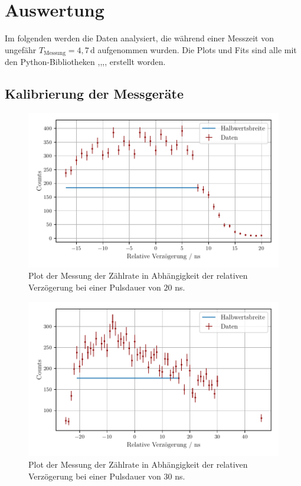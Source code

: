 \section{Auswertung}
\label{sec:Auswertung}

Im folgenden werden die Daten analysiert, die während einer Messzeit von ungefähr $T_\text{Messung} = 4{,}7  \, \unit\day$ aufgenommen wurden.
Die Plots und Fits sind alle mit den Python-Bibliotheken \cite{matplotlib},\cite{numpy},\cite{scipy},\cite{uncertainties},\cite{reback2020pandas} erstellt worden.

\subsection{Kalibrierung der Messgeräte}

\begin{figure}
    \centering
    \includegraphics[width = 0.7 \linewidth]{build/20ns_plot.pdf}
    \caption{Plot der Messung der Zählrate in Abhängigkeit der relativen Verzögerung bei einer Pulsdauer von $20$ ns.}
    \label{fig:20ns_plot}
\end{figure}

\begin{figure}
    \centering
    \includegraphics[width = 0.7 \linewidth]{build/30ns_plot.pdf}
    \caption{Plot der Messung der Zählrate in Abhängigkeit der relativen Verzögerung bei einer Pulsdauer von $30$ ns.}
    \label{fig:30ns_plot}
\end{figure}

